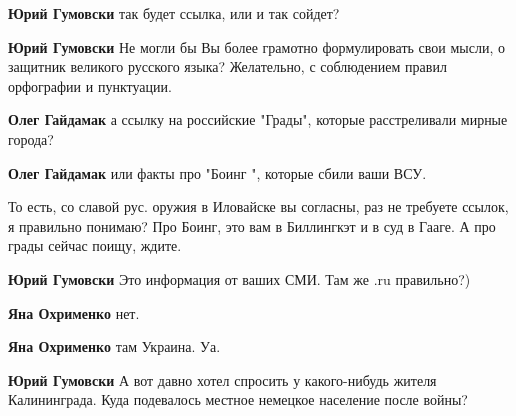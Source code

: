 \begin{itemize}
\begin{itemize}
\textbf{Юрий Гумовски} так будет ссылка, или и так сойдет?


\textbf{Юрий Гумовски} Не могли бы Вы более грамотно формулировать свои мысли,
о защитник великого русского языка? Желательно, с соблюдением правил орфографии
и пунктуации.


\textbf{Олег Гайдамак} а ссылку на российские "Грады", которые расстреливали мирные города?


\textbf{Олег Гайдамак} или факты про "Боинг ", которые сбили ваши ВСУ.


То есть, со славой рус. оружия в Иловайске вы согласны, раз не требуете ссылок,
я правильно понимаю? Про Боинг, это вам в Биллингкэт и в суд в Гааге. А про
грады сейчас поищу, ждите.



\textbf{Юрий Гумовски} Это информация от ваших СМИ. Там же .ru правильно?)


\textbf{Яна Охрименко} нет.


\textbf{Яна Охрименко} там Украина. Уа.


\textbf{Юрий Гумовски} А вот давно хотел спросить у какого-нибудь жителя Калининграда. Куда подевалось местное немецкое население после войны?


\end{itemize}
\end{itemize}
